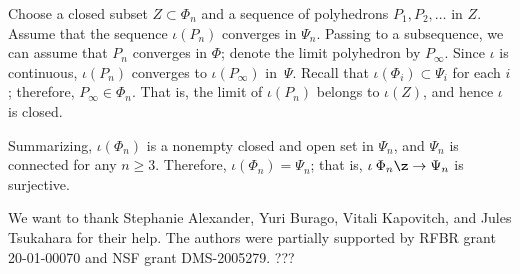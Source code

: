 Choose a closed subset $Z\subset \Phi_n$ and a sequence of polyhedrons $P_1,P_2,\ldots$ in $Z$.
Assume that the sequence $\iota(P_n)$ converges in $\Psi_n$.
Passing to a subsequence, we can assume that $P_n$ converges in $\Phi$; denote the limit polyhedron by  $P_\infty$.
Since $\iota$ is continuous, $\iota(P_n)$ converges to $\iota(P_\infty)$ in~$\Psi$.
Recall that $\iota(\Phi_i)\subset\Psi_i$ for each $i$; therefore, $P_\infty\in \Phi_n$.
That is, the limit of $\iota(P_n)$ belongs to $\iota(Z)$, and hence $\iota$ is closed.

Summarizing, $\iota(\Phi_n)$ is a nonempty closed and open set in $\Psi_n$, and $\Psi_n$ is connected for any $n\ge 3$.
Therefore, $\iota(\Phi_n)=\Psi_n$; that is, $\iota\:\Phi_n\z\to\Psi_n$ is surjective.
\qeds

We want to thank Stephanie Alexander,
Yuri Burago,
Vitali Kapovitch,
and Jules %
Tsukahara
for their help.
The authors were partially supported by RFBR grant 20-01-00070 and NSF grant DMS-2005279. ???
